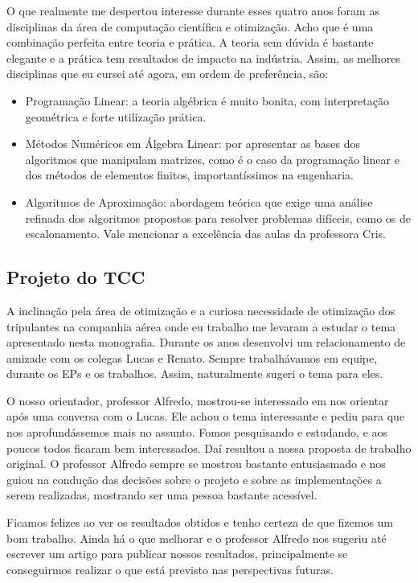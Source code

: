 O que realmente me despertou interesse durante esses quatro anos foram as disciplinas da área de
computação científica e otimização. Acho que é uma combinação perfeita entre teoria e prática. A
teoria sem dúvida é bastante elegante e a prática tem resultados de impacto na indústria. Assim,
as melhores disciplinas que eu cursei até agora, em ordem de preferência, são:

\begin{itemize}
	\item Programação Linear: a teoria algébrica é muito bonita, com interpretação geométrica e forte
	utilização prática.
	\item Métodos Numéricos em Álgebra Linear: por apresentar as bases dos algoritmos que manipulam
	matrizes, como é o caso da programação linear e dos métodos de elementos finitos, importantíssimos
	na engenharia.
	\item Algoritmos de Aproximação: abordagem teórica que exige uma análise refinada dos algoritmos
	propostos para resolver problemas difíceis, como os de escalonamento. 
	Vale mencionar a excelência das aulas da professora Cris.
\end{itemize}

\subsection{Projeto do TCC}

A inclinação pela área de otimização e a curiosa necessidade de otimização dos tripulantes na
companhia aérea onde eu trabalho me levaram a estudar o tema apresentado nesta monografia. Durante
os anos desenvolvi um relacionamento de amizade com os colegas Lucas e Renato. Sempre trabalhávamos
em equipe, durante os EPs e os trabalhos. Assim, naturalmente sugeri o tema para eles.

O nosso orientador, professor Alfredo, mostrou-se interessado em nos orientar após uma conversa com
o Lucas. Ele achou o tema interessante e pediu para que nos aprofundássemos mais no assunto. Fomos
pesquisando e estudando, e aos poucos todos ficaram bem interessados. Daí resultou a nossa proposta
de trabalho original. O professor Alfredo sempre se mostrou bastante entusiasmado e nos guiou na
condução das decisões sobre o projeto e sobre as implementações a serem realizadas, mostrando ser
uma pessoa bastante acessível.

Ficamos felizes ao ver os resultados obtidos e tenho certeza de que fizemos um bom trabalho. Ainda
há o que melhorar e o professor Alfredo nos sugeriu até escrever um artigo para publicar nossos
resultados, principalmente se conseguirmos realizar o que está previsto nas perspectivas futuras.

